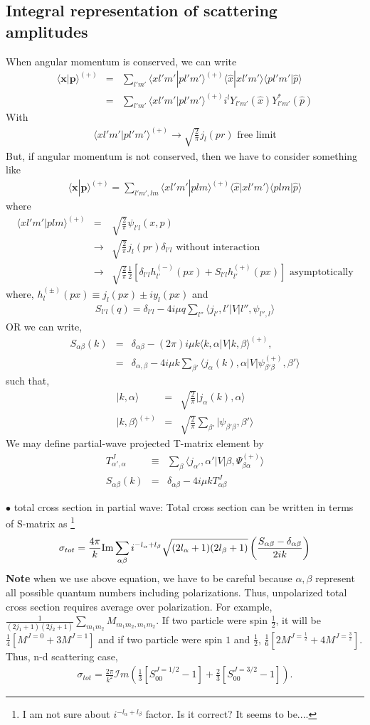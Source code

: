 \documentclass[10pt]{article}
\def\bm{\boldsymbol}
\newcommand{\bea}{\begin{eqnarray}}
\newcommand{\eea}{\end{eqnarray}}
\newcommand{\no}{\nonumber \\}
\def\vp{{\bm p}}
\def\vx{{\bm x}}
\def\la{\langle}
\def\ra{\rangle}
\begin{document}
\subsection{Integral representation of scattering amplitudes}
When angular momentum is conserved, we can write
\bea
\la \vx|\vp\ra^{(+)}&=&
\sum_{l' m'}\la x l' m' | pl'm'\ra^{(+)} \la\hat{x}|xl'm'\ra
                               \la p l'm' |\hat{p}\ra \no
&=&\sum_{l 'm '}\la x l' m' | pl'm'\ra^{(+)} i^l Y_{l' m'}(\hat{x})
                               Y^*_{l' m'}(\hat{p})   
\eea
With
\bea
\la x l' m' | pl'm'\ra^{(+)}\to \sqrt{\frac{2}{\pi}}j_l(pr)
\mbox{ free limit} 
\eea
But, if angular momentum is not conserved, then
we have to consider something like
\bea
\la \vx|\vp\ra^{(+)}
=\sum_{l'm', lm}\la x l' m'|p l m\ra^{(+)}
                 \la \hat{x}|x l' m'\ra \la p l m|\hat{p}\ra 
\eea
where
\bea
\la x l'm'|p l m\ra^{(+)} 
&=& \sqrt{\frac{2}{\pi}}\psi_{l'l}(x,p)
\no
&\to& \sqrt{\frac{2}{\pi}}j_l(pr)\delta_{l' l} 
 \mbox{ without interaction} \no
&\to& \sqrt{\frac{2}{\pi}}
      \frac{1}{2}[\delta_{l'l}h_{l'}^{(-)}(px)
                 +S_{l'l} h_{l'}^{(+)}(px)]
 \mbox{ asymptotically}                      
\eea
where, $h^{(\pm)}_l(px)\equiv j_l(px)\pm i y_l(px)$
and 
\bea
S_{l' l}(q)=\delta_{l'l}-4i\mu q\sum_{l''}
         \la j_{l'} , l'| V| l'', \psi_{l'',l}\ra  
\eea
OR we can write,
\bea
S_{\alpha\beta}(k)
&=&\delta_{\alpha\beta}-(2\pi)i \mu k 
        \la k,\alpha| V| k,\beta\ra^{(+)},\no
&=&\delta_{\alpha,\beta}-4 i \mu k \sum_{\beta'}
       \la j_{\alpha}(k),\alpha|V|\psi^{(+)}_{\beta'\beta},\beta'\ra
\eea
such that,
\bea
|k,\alpha\ra&=&\sqrt{\frac{2}{\pi}}|j_{\alpha}(k),\alpha\ra \no
|k,\beta\ra^{(+)}&=&\sqrt{\frac{2}{\pi}}
                    \sum_{\beta'}|\psi_{\beta'\beta},\beta'\ra
\eea
We may define partial-wave projected T-matrix element by
\bea
T^J_{\alpha',\alpha}&\equiv&\sum_{\beta} 
    \la j_{\alpha'},\alpha'|V|\beta,\Psi^{(+)}_{\beta\alpha}\ra\no
S_{\alpha\beta}(k)&=&\delta_{\alpha\beta}-4i\mu k T^J_{\alpha\beta}    
\eea

$\bullet$ total cross section in partial wave:
Total cross section can be written in terms of S-matrix as
\footnote{
I am not sure about $i^{-l_\alpha+l_\beta}$ factor.
Is it correct? It seems to be....
}
\bea
\sigma_{tot}=\frac{4\pi}{k}{\rm Im}\sum_{\alpha\beta}i^{-l_\alpha+l_\beta}\sqrt{(2l_\alpha+1)(2l_\beta+1)}
\left(\frac{S_{\alpha\beta}-\delta_{\alpha\beta}}{2i k}\right)
\eea
{\bf Note} when we use above equation,
we have to be careful because $\alpha,\beta$ represent
all possible quantum numbers including polarizations.
Thus, unpolarized total cross section requires average 
over polarization. 
For example, 
$\frac{1}{(2j_1+1)(2j_2+1)}\sum_{m_1 m_2} M_{m_1m_2,m_1m_2}$.
If two particle were spin $\frac{1}{2}$, it will be
$\frac{1}{4}[M^{J=0}+3 M^{J=1}]$ and if two particle were
spin $1$ and $\frac{1}{2}$,
$\frac{1}{6}[2 M^{J=\frac{1}{2}}+4 M^{J=\frac{3}{2}}]$.
Thus, n-d scattering case,
\bea
\sigma_{tot}=\frac{2\pi}{k^2}{\mathcal Im}(\frac{1}{3}[S^{J=1/2}_{00}-1]
+\frac{2}{3}[S^{J=3/2}_{00}-1]).
\eea 
\end{document}
